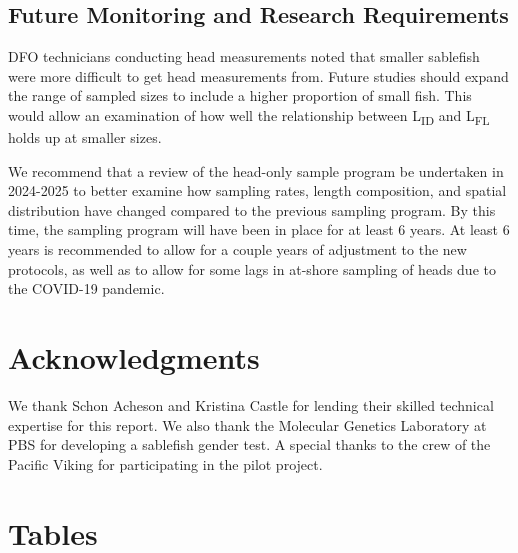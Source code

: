 \documentclass[12pt]{article}\usepackage[]{graphicx}\usepackage[]{color}
\begin{document}
\hypertarget{future-monitoring-and-research-requirements}{%
\subsection{Future Monitoring and Research Requirements}\label{future-monitoring-and-research-requirements}}

DFO technicians conducting head measurements noted that smaller sablefish were more difficult to get head measurements from. Future studies should expand the range of sampled sizes to include a higher proportion of small fish. This would allow an examination of how well the relationship between L\textsubscript{ID} and L\textsubscript{FL} holds up at smaller sizes.

We recommend that a review of the head-only sample program be undertaken in 2024-2025 to better examine how sampling rates, length composition, and spatial distribution have changed compared to the previous sampling program. By this time, the sampling program will have been in place for at least 6 years. At least 6 years is recommended to allow for a couple years of adjustment to the new protocols, as well as to allow for some lags in at-shore sampling of heads due to the COVID-19 pandemic.

\hypertarget{acknowledgments}{%
\section{Acknowledgments}\label{acknowledgments}}

We thank Schon Acheson and Kristina Castle for lending their skilled technical expertise for this report. We also thank the Molecular Genetics Laboratory at PBS for developing a sablefish gender test. A special thanks to the crew of the Pacific Viking for participating in the pilot project.

\clearpage

\hypertarget{tables}{%
\section{Tables}\label{tables}}
\end{document}
